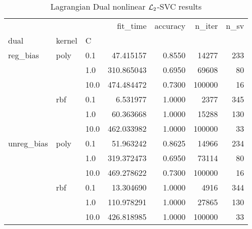 \begin{table}[H]
\centering
\caption{Lagrangian Dual nonlinear $\protect \mathcal{L}_2$-SVC results}
\label{nonlinear_lagrangian_dual_l2_svc_cv_results}
\begin{tabular}{lllrrrr}
\toprule
           &     &      &    fit\_time &  accuracy &  n\_iter &  n\_sv \\
dual & kernel & C &             &           &         &       \\
\midrule
reg\_bias & poly & 0.1  &   47.415157 &    0.8550 &   14277 &   233 \\
           &     & 1.0  &  310.865043 &    0.6950 &   69608 &    80 \\
           &     & 10.0 &  474.484472 &    0.7300 &  100000 &    16 \\
           & rbf & 0.1  &    6.531977 &    1.0000 &    2377 &   345 \\
           &     & 1.0  &   60.363668 &    1.0000 &   15288 &   130 \\
           &     & 10.0 &  462.033982 &    1.0000 &  100000 &    33 \\
unreg\_bias & poly & 0.1  &   51.963242 &    0.8625 &   14966 &   234 \\
           &     & 1.0  &  319.372473 &    0.6950 &   73114 &    80 \\
           &     & 10.0 &  469.278622 &    0.7300 &  100000 &    16 \\
           & rbf & 0.1  &   13.304690 &    1.0000 &    4916 &   344 \\
           &     & 1.0  &  110.978291 &    1.0000 &   27865 &   130 \\
           &     & 10.0 &  426.818985 &    1.0000 &  100000 &    33 \\
\bottomrule
\end{tabular}
\end{table}
